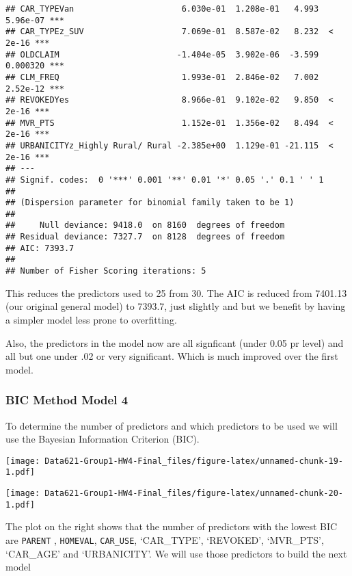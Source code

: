 \documentclass[]{article}
\begin{document}
\begin{verbatim}
## CAR_TYPEVan                      6.030e-01  1.208e-01   4.993 5.96e-07 ***
## CAR_TYPEz_SUV                    7.069e-01  8.587e-02   8.232  < 2e-16 ***
## OLDCLAIM                        -1.404e-05  3.902e-06  -3.599 0.000320 ***
## CLM_FREQ                         1.993e-01  2.846e-02   7.002 2.52e-12 ***
## REVOKEDYes                       8.966e-01  9.102e-02   9.850  < 2e-16 ***
## MVR_PTS                          1.152e-01  1.356e-02   8.494  < 2e-16 ***
## URBANICITYz_Highly Rural/ Rural -2.385e+00  1.129e-01 -21.115  < 2e-16 ***
## ---
## Signif. codes:  0 '***' 0.001 '**' 0.01 '*' 0.05 '.' 0.1 ' ' 1
## 
## (Dispersion parameter for binomial family taken to be 1)
## 
##     Null deviance: 9418.0  on 8160  degrees of freedom
## Residual deviance: 7327.7  on 8128  degrees of freedom
## AIC: 7393.7
## 
## Number of Fisher Scoring iterations: 5
\end{verbatim}

This reduces the predictors used to 25 from 30. The AIC is reduced from
7401.13 (our original general model) to 7393.7, just slightly and but we
benefit by having a simpler model less prone to overfitting.

Also, the predictors in the model now are all signficant (under 0.05 pr
level) and all but one under .02 or very significant. Which is much
improved over the first model.

\hypertarget{bic-method-model-4}{%
\subsubsection{BIC Method Model 4}\label{bic-method-model-4}}

To determine the number of predictors and which predictors to be used we
will use the Bayesian Information Criterion (BIC).

\texttt{[image: Data621-Group1-HW4-Final\_files/figure-latex/unnamed-chunk-19-1.pdf]}

\texttt{[image: Data621-Group1-HW4-Final\_files/figure-latex/unnamed-chunk-20-1.pdf]}

The plot on the right shows that the number of predictors with the
lowest BIC are \texttt{PARENT} , \texttt{HOMEVAL}, \texttt{CAR\_USE},
`CAR\_TYPE', `REVOKED', `MVR\_PTS', `CAR\_AGE' and `URBANICITY'. We will
use those predictors to build the next model
\end{document}
